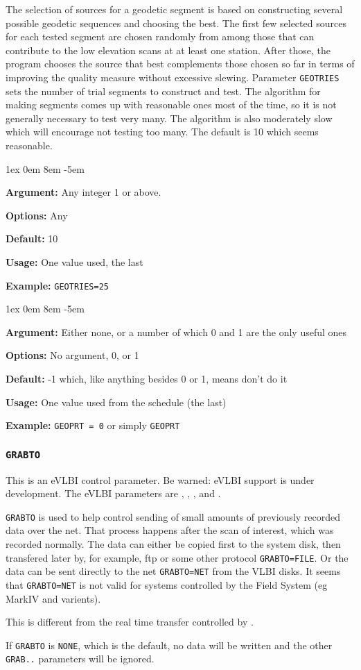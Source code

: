 \documentclass{report}
\newcommand{\rcwbox}[5]{
  \begin{list}{}{\parsep 1ex  \itemsep 0em
                 \leftmargin 8em  \itemindent -5em }
    \item {\bf Argument:} #1
    \item {\bf Options:}  #2
    \item {\bf Default:}  #3
    \item {\bf Usage:}    #4
    \item {\bf Example:}  #5
  \end{list}
}
\begin{document}
The selection of sources for a geodetic segment is based on
constructing several possible geodetic sequences and choosing the
best.  The first few selected sources for each tested segment are
chosen randomly from among those that can contribute to the low
elevation scans at at least one station.  After those, the program
chooses the source that best complements those chosen so far in
terms of improving the quality measure without excessive slewing.
Parameter {\tt GEOTRIES} sets the number of trial segments to
construct and test.  The algorithm for making segments comes up
with reasonable ones most of the time, so it is not generally
necessary to test very many.  The algorithm is also moderately
slow which will encourage not testing too many.  The default is
10 which seems reasonable.

\rcwbox
{Any integer 1 or above.}
{Any}
{10}
{One value used, the last}
{{\tt GEOTRIES=25}}


\rcwbox
{Either none, or a number of which 0 and 1 are the only useful ones}
{No argument, 0, or 1}
{-1 which, like anything besides 0 or 1, means don't do it}
{One value used from the schedule (the last)}
{{\tt GEOPRT = 0} or simply {\tt GEOPRT}}


\subsubsection{\label{MP:GRABTO}{\tt GRABTO}}

This is an eVLBI control parameter.  Be warned: eVLBI support is
under development.
The eVLBI parameters are ,
, ,
and .

{\tt GRABTO} is used to help control sending of small amounts of
previously recorded data over the net.  That process happens after the
scan of interest, which was recorded normally.  The data can either be
copied first to the system disk, then transfered later by, for
example, ftp or some other protocol {\tt GRABTO=FILE}.  Or the data
can be sent directly to the net {\tt GRABTO=NET} from the VLBI disks.
It seems that {\tt GRABTO=NET} is not valid for systems controlled by
the Field System (eg MarkIV and varients).

This is different from the real time transfer controlled by
.

If {\tt GRABTO} is {\tt NONE}, which is the default, no data will be
written and the other {\tt GRAB..} parameters will be ignored.
\end{document}
